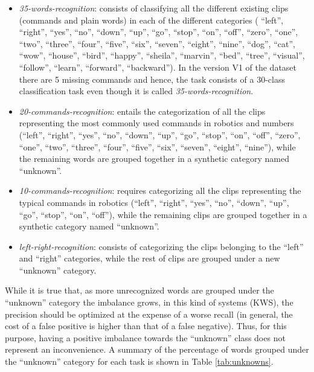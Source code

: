 \begin{itemize}
	\item \textit{35-words-recognition}: consists of classifying all the different existing clips (commands and plain words) in each of the different categories (
	``left'',
	``right'',
	``yes'',
	``no'',
	``down'',
	``up'',
	``go'',
	``stop'',
	``on'',
	``off'',
	``zero'',
	``one'',
	``two'',
	``three'',
	``four'',
	``five'',
	``six'',
	``seven'',
	``eight'',
	``nine'',
	``dog'',
	``cat'',
	``wow'',
	``house'',
	``bird'',
	``happy'',
	``sheila'',
	``marvin'',
	``bed'',
	``tree'',
	``visual'',
	``follow'',
	``learn'',
	``forward'',
	``backward''). In the version V1 of the dataset there are 5 missing commands and hence, the task consists of a 30-class classification task even though it is called \textit{35-words-recognition}.
	\item \textit{20-commands-recognition}: entails the categorization of all the clips representing the most commonly used commands in robotics \autocite{Warden2018} and numbers (``left'',
	``right'',
	``yes'',
	``no'',
	``down'',
	``up'',
	``go'',
	``stop'',
	``on'',
	``off'',
	``zero'',
	``one'',
	``two'',
	``three'',
	``four'',
	``five'',
	``six'',
	``seven'',
	``eight'',
	``nine''), while the remaining words are grouped together in a synthetic category named ``unknown''.
	\item \textit{10-commands-recognition}: requires categorizing all the clips representing the typical commands in robotics (``left'',
	``right'',
	``yes'',
	``no'',
	``down'',
	``up'',
	``go'',
	``stop'',
	``on'',
	``off''), while the remaining clips are grouped together in a synthetic category named ``unknown''.
	\item \textit{left-right-recognition}: consists of categorizing the clips belonging to the ``left'' and ``right'' categories, while the rest of clips are grouped under a new ``unknown'' category.
\end{itemize}


While it is true that, as more unrecognized words are grouped under the ``unknown'' category the imbalance grows, in this kind of systems (KWS), the precision should be optimized at the expense of a worse recall (in general, the cost of a false positive is higher than that of a false negative). Thus, for this purpose, having a positive imbalance towards the ``unknown'' class does not represent an inconvenience. A summary of the percentage of words grouped under the ``unknown'' category for each task is shown in Table \ref{tab:unknowns}.

